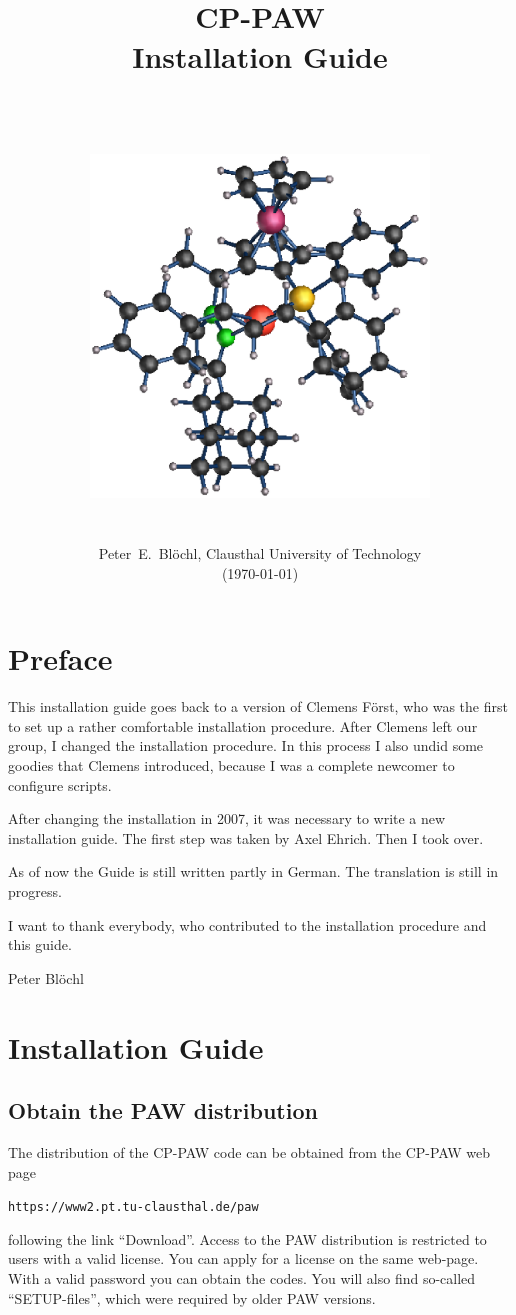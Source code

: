 \documentclass[a4paper,10pt]{report}
\title{{\bfseries\Huge
\hrulefill\\
\hrulefill CP-PAW\hrulefill\\
\hrulefill Installation Guide\hrulefill\\
\hrulefill\\}
\hfill\\
\includegraphics[width=9cm]{Figs/big.eps}
}
\date{\hrulefill\\Peter~E.~Bl\"ochl, Clausthal University of Technology\\(\today)}
\newcommand{\mytt}[1]{{\tt #1}}
\begin{document}
\maketitle
\tableofcontents

\chapter{Preface}
This installation guide goes back to a version of Clemens F\"orst, who
was the first to set up a rather comfortable installation procedure.
After Clemens left our group, I changed the installation procedure. In
this process I also undid some goodies that Clemens introduced,
because I was a complete newcomer to configure scripts.

After changing the installation in 2007, it was necessary to write a
new installation guide. The first step was taken by Axel Ehrich. Then
I took over.

As of now the Guide is still written partly in German. The translation
is still in progress.

I want to thank everybody, who contributed to the installation
procedure and this guide.

Peter Bl\"ochl

\chapter{Installation Guide}
\label{sec:vollstinst}

\section{Obtain the PAW distribution}
The distribution of the CP-PAW code can be obtained from the CP-PAW
web page
\begin{center}
\mytt{https://www2.pt.tu-clausthal.de/paw}
\end{center}
following the link ``Download''. Access to the PAW distribution is
restricted to users with a valid license. You can apply for a license
on the same web-page. With a valid password you can obtain the codes.
You will also find so-called ``SETUP-files'', which
were required by older PAW versions.
\end{document}
